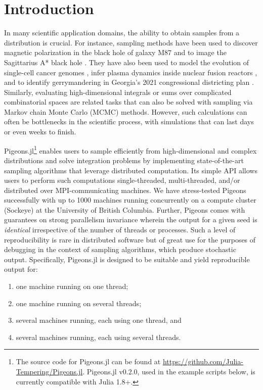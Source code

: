 \section{Introduction}
In many scientific application domains, the ability to obtain samples from a 
distribution is crucial. 
For instance, sampling methods have been used to discover magnetic polarization 
in the black hole of galaxy M87 \cite{akiyama2021seven}
and to image the Sagittarius A* black hole \cite{akiyama2022first}.
They have also been used to 
model the evolution of single-cell cancer genomes \cite{salehi2021clonal}, 
infer plasma dynamics inside nuclear fusion reactors \cite{gota2021overview}, 
and to identify gerrymandering in Georgia's 2021 congressional districting plan 
\cite{zhao2022mathematically}.
Similarly, evaluating high-dimensional integrals or sums over complicated 
combinatorial spaces are related tasks that can also be solved with sampling 
via Markov chain Monte Carlo (MCMC) methods. 
However, such calculations can often be bottlenecks in the scientific process, with 
simulations that can last days or even weeks to finish. 

\medskip
Pigeons.jl\footnote{The source code for Pigeons.jl can be found at 
\url{https://github.com/Julia-Tempering/Pigeons.jl}. 
Pigeons.jl v0.2.0, used in the example scripts below, is currently compatible with Julia 1.8+.}
enables users to sample efficiently from high-dimensional and complex distributions 
and solve integration problems by 
implementing state-of-the-art sampling algorithms \cite{syed2021nrpt,surjanovic2022vpt} 
that leverage distributed computation. Its simple API allows users to perform such computations 
single-threaded, multi-threaded, and/or distributed over MPI-communicating machines. 
We have stress-tested Pigeons successfully with up to 1000 machines running 
concurrently on a compute cluster (Sockeye) at the University of British Columbia.
Further, Pigeons comes with guarantees on strong parallelism invariance wherein 
the output for a given seed is \emph{identical} irrespective 
of the number of threads or processes. 
Such a level of reproducibility is rare in distributed software but of 
great use for the purposes of debugging in the context of sampling algorithms, 
which produce stochastic output.
Specifically, Pigeons.jl is designed to be suitable and yield reproducible output for:
\begin{enumerate}
    \item one machine running on one thread;
    \item one machine running on several threads;
    \item several machines running, each using one thread, and
    \item several machines running, each using several threads.
\end{enumerate}


